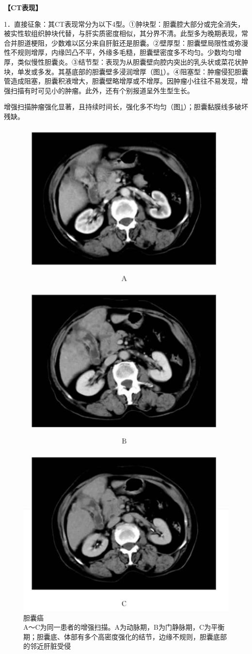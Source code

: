 \textbf{【CT表现】}

1．直接征象：其CT表现常分为以下4型。①肿块型：胆囊腔大部分或完全消失，被实性软组织肿块代替，与肝实质密度相似，其分界不清。此型多为晚期表现，常合并胆道梗阻，少数难以区分来自肝脏还是胆囊。②壁厚型：胆囊壁局限性或弥漫性不规则增厚，内缘凹凸不平，外缘多毛糙，胆囊壁密度多不均匀。少数均匀增厚，类似慢性胆囊炎。③结节型：表现为从胆囊壁向腔内突出的乳头状或菜花状肿块，单发或多发。其基底部的胆囊壁多浸润增厚（图\ref{fig12-7}）。④阻塞型：肿瘤侵犯胆囊管造成阻塞，胆囊积液增大，胆囊壁略增厚或不增厚。因肿瘤小往往不易发现，增强扫描有时可见小的肿瘤。此外，还有个别报道呈外生型生长。

增强扫描肿瘤强化显著，且持续时间长，强化多不均匀（图\ref{fig12-7}）；胆囊黏膜线多破坏残缺。

\begin{figure}[!htbp]
 \centering
 \includegraphics[width=.7\textwidth,height=\textheight,keepaspectratio]{./images/Image00297.jpg}
 \captionsetup{justification=centering}
 \caption{胆囊癌\\{\small A～C为同一患者的增强扫描。A为动脉期，B为门静脉期，C为平衡期；胆囊底、体部有多个高密度强化的结节，边缘不规则，胆囊底部的邻近肝脏受侵}}
 \label{fig12-7}
  \end{figure} 

